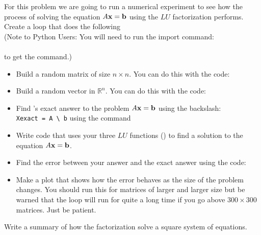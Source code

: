 \begin{problem}
    For this problem we are going to run a numerical experiment to see how the process of
    solving the equation $A {\bf x} = {\bf b}$ using the $LU$ factorization performs.\\ 
    \noindent Create a loop that does the following 
    \ifnum{}
    \\ (Note to Python Users: You will need to run the import command:\\ \\ to get the  command.)
    \fi
    \begin{itemize}
        \item Build a random matrix of size $n \times n$. You can do this with the code:
            \\
        \item Build a random vector in $\mathbb{R}^{n}$. You can do this with the code: \\
        \item Find \ProgLang's exact answer to the problem $A{\bf x}={\bf b}$ 
            \ifnum{}
            using the backslash: \\
            \verb|Xexact = A \ b|
            \else
            using the  command \\
            \fi
        \item Write code that uses your three $LU$ functions () to find a solution to the equation $A{\bf x}={\bf b}$.
        \item Find the error between your answer and the exact answer using the code: \\
            \ifnum{}
            \else
            \fi
        \item Make a plot that shows how the error behaves as the size of the problem
            changes. You should run this for matrices of larger and larger size but be
            warned that the loop will run for quite a long time if you go above
            $300 \times 300$ matrices. Just be patient.
    \end{itemize}
\end{problem}

\begin{problem}
    Write a summary of how the  factorization solve a square system of
    equations.
\end{problem}



